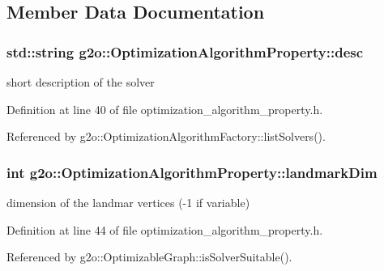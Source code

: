 \subsection{Member Data Documentation}
\subsubsection[{\texorpdfstring{desc}{desc}}]{\setlength{\rightskip}{0pt plus 5cm}std\+::string g2o\+::\+Optimization\+Algorithm\+Property\+::desc}\hypertarget{structg2o_1_1OptimizationAlgorithmProperty_a9390204f7ff2f092241f55656d8458b1}{}\label{structg2o_1_1OptimizationAlgorithmProperty_a9390204f7ff2f092241f55656d8458b1}


short description of the solver 



Definition at line 40 of file optimization\+\_\+algorithm\+\_\+property.\+h.



Referenced by g2o\+::\+Optimization\+Algorithm\+Factory\+::list\+Solvers().

\subsubsection[{\texorpdfstring{landmark\+Dim}{landmarkDim}}]{\setlength{\rightskip}{0pt plus 5cm}int g2o\+::\+Optimization\+Algorithm\+Property\+::landmark\+Dim}\hypertarget{structg2o_1_1OptimizationAlgorithmProperty_ad946dec26df70a6fb6d99f2ab76db269}{}\label{structg2o_1_1OptimizationAlgorithmProperty_ad946dec26df70a6fb6d99f2ab76db269}


dimension of the landmar vertices (-\/1 if variable) 



Definition at line 44 of file optimization\+\_\+algorithm\+\_\+property.\+h.



Referenced by g2o\+::\+Optimizable\+Graph\+::is\+Solver\+Suitable().

